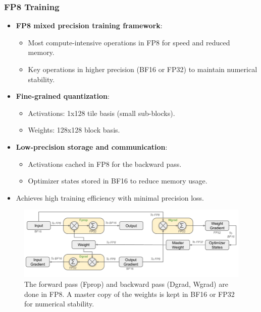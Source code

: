 \documentclass{beamer}
\begin{document}
\begin{frame}
    \frametitle{FP8 Training}
    \begin{itemize}
        \item \textbf{FP8 mixed precision training framework}:
              \begin{itemize}
                  \item Most compute-intensive operations in FP8 for speed and reduced memory.
                  \item Key operations in higher precision (BF16 or FP32) to maintain numerical stability.
              \end{itemize}
        \item \textbf{Fine-grained quantization}:
              \begin{itemize}
                  \item Activations: 1x128 tile basis (small sub-blocks).
                  \item Weights: 128x128 block basis.
              \end{itemize}
        \item \textbf{Low-precision storage and communication}:
              \begin{itemize}
                  \item Activations cached in FP8 for the backward pass.
                  \item Optimizer states stored in BF16 to reduce memory usage.
              \end{itemize}
        \item Achieves high training efficiency with minimal precision loss.
    \end{itemize}
\end{frame}

\begin{frame}
    \begin{figure}[htbp]
        \centering
        \includegraphics[scale=1.20394]{attachments/mixed-precision-training.png}
        \caption{The forward pass (Fprop) and backward pass (Dgrad, Wgrad) are done in FP8. A master copy of the weights is kept in BF16 or FP32 for numerical stability.}
    \end{figure}
\end{frame}
\end{document}
